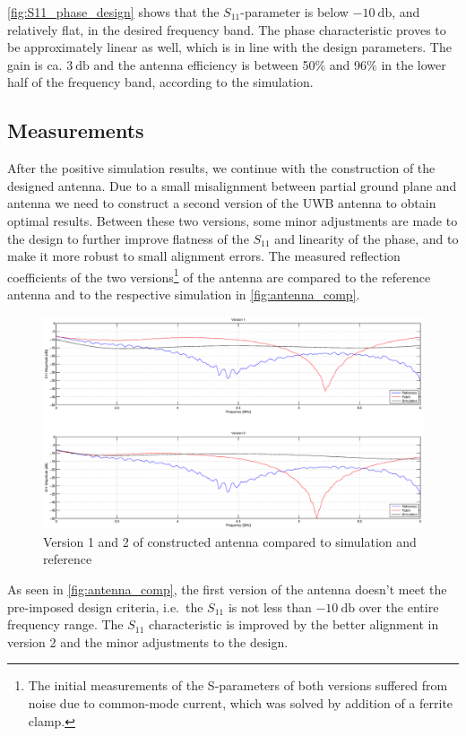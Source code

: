 \documentclass[a4paper]{article}        %
\begin{document}
		\autoref{fig:S11_phase_design} shows that the $S_{11}$-parameter is below $\SI{-10}{\decibel}$, and relatively flat, in the desired frequency band. The phase characteristic proves to be approximately linear as well, which is in line with the design parameters. The gain is ca. $\SI{3}{\decibel}$ and the antenna efficiency is between 50\% and 96\% in the lower half of the frequency band, according to the simulation. 

	\subsection{Measurements}
		After the positive simulation results, we continue with the construction of the designed antenna. Due to a small misalignment between partial ground plane and antenna we need to construct a second version of the UWB antenna to obtain optimal results. Between these two versions, some minor adjustments are made to the design to further improve flatness of the $S_{11}$ and linearity of the phase, and to make it more robust to small alignment errors. The measured reflection coefficients of the two versions\footnote{The initial measurements of the S-parameters of both versions suffered from noise due to common-mode current, which was solved by addition of a ferrite clamp.} of the antenna are compared to the reference antenna and to the respective simulation in \autoref{fig:antenna_comp}. 

		\begin{figure}[H]
			\centering
			\includegraphics[width=\textwidth]{images/antenna/antenna_comparison}
			\caption{Version 1 and 2 of constructed antenna compared to simulation and reference}
			\label{fig:antenna_comp}
		\end{figure}

		As seen in \autoref{fig:antenna_comp}, the first version of the antenna doesn't meet the pre-imposed design criteria, i.e.\ the $S_{11}$ is not less than $\SI{-10}{\decibel}$ over the entire frequency range.
		The $S_{11}$ characteristic is improved by the better alignment in version 2 and the minor adjustments to the design.
\end{document}
